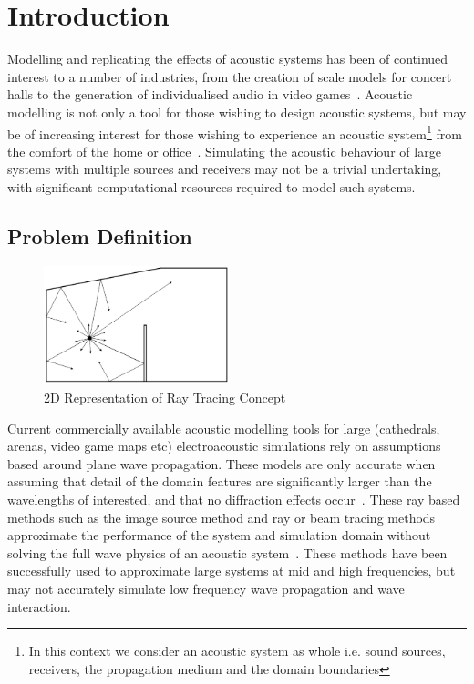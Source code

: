 \chapter{Introduction}

Modelling and replicating the effects of acoustic systems has been of continued interest to a number of industries, from the creation of scale models for concert halls to the generation of individualised audio in video games~\cite{Rindel2000}. Acoustic modelling is not only a tool for those wishing to design acoustic systems, but may be of increasing interest for those wishing to experience an acoustic system\footnote{In this context we consider an acoustic system as whole i.e. sound sources, receivers, the propagation medium and the domain boundaries} from the comfort of the home or office~\cite{Tsingos2009}. Simulating the acoustic behaviour of large systems with multiple sources and receivers may not be a trivial undertaking, with significant computational resources required to model such systems. 

\section{Problem Definition}

\begin{figure}
  \includegraphics[width=0.48\textwidth]{./graphics/raytracing.png}
  \caption{2D Representation of Ray Tracing Concept~\cite{Elorza2005}}
\end{figure}

Current commercially available acoustic modelling tools for large (cathedrals, arenas, video game maps etc) electroacoustic simulations rely on assumptions based around plane wave propagation. These models are only accurate when assuming that detail of the domain features are significantly larger than the wavelengths of interested, and that no diffraction effects occur~\cite{Schmalle2011}. These ray based methods such as the image source method and ray or beam tracing methods approximate the performance of the system and simulation domain without solving the full wave physics of an acoustic system~\cite{Monks1996a}. These methods have been successfully used to approximate large systems at mid and high frequencies, but may not accurately simulate low frequency wave propagation and wave interaction.\\

